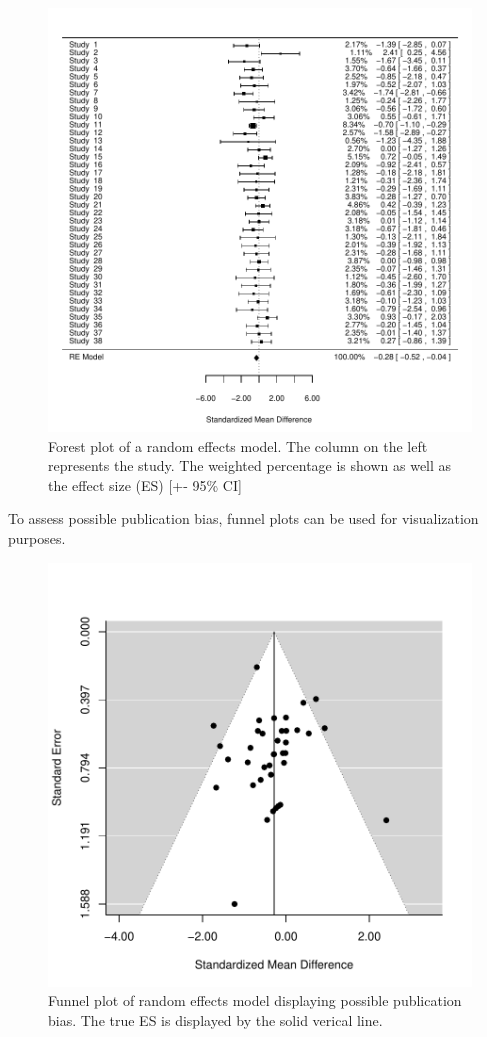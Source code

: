 \documentclass[11pt, a4paper]{article} %
\begin{document}
\begin{figure}
\captionsetup{width=0.6\textwidth}
\centering
\includegraphics{sweave_document_TB-forest_re}

\caption{Forest plot of a random effects model. The column on the left represents the study. The weighted percentage is shown as well as the effect size (ES) [+- 95\% CI]}
\end{figure}


To assess possible publication bias, funnel plots can be used for visualization purposes.

\begin{figure}
\captionsetup{width=0.6\textwidth}
\centering
\includegraphics{sweave_document_TB-funnelplot}
\caption{Funnel plot of random effects model displaying possible publication bias. The true ES is displayed by the solid verical line.}
\end{figure}
\end{document}
